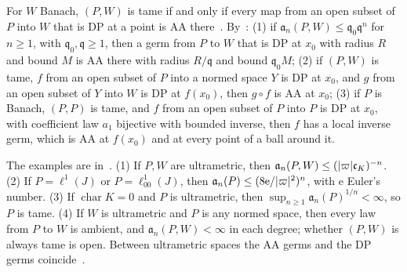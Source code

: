 For $W$ Banach, $(P,W)$ is tame if and only if every map from an open subset of $P$ into $W$ that is DP at a point is AA there~\cite[Proposition~14.37]{I}. By~\cite[Theorem~14.38]{I}: (1) if $\mathfrak a_n(P,W)\le\mathfrak q_0\mathfrak q^n$ for $n\ge1$, with $\mathfrak q_0,\mathfrak q\ge1$, then a germ from $P$ to $W$ that is DP at $x_0$ with radius $R$ and bound $M$ is AA there with radius $R/\mathfrak q$ and bound $\mathfrak q_0M$; (2) if $(P,W)$ is tame, $f$ from an open subset of $P$ into a normed space $Y$ is DP at $x_0$, and $g$ from an open subset of $Y$ into $W$ is DP at $f(x_0)$, then $g\circ f$ is AA at $x_0$; (3) if $P$ is Banach, $(P,P)$ is tame, and $f$ from an open subset of $P$ into $P$ is DP at $x_0$, with coefficient law $a_1$ bijective with bounded inverse, then $f$ has a local inverse germ, which is AA at $f(x_0)$ and at every point of a ball around it.

The examples are in~\cite[Theorem~14.39]{I}. (1) If $P,W$ are ultrametric, then $\mathfrak a_n(P,W)\le(\lvert \varpi\rvert\mathfrak c_K)^{-n}$. (2) If $P=\ell^1(J)$ or $P=\ell^1_{00}(J)$, then $\mathfrak a_n(P)\le(8\mathrm e/\lvert \varpi\rvert^2)^n$, with $\mathrm e$ Euler's number. (3) If $\operatorname{char}K=0$ and $P$ is ultrametric, then $\sup_{n\ge1}\mathfrak a_n(P)^{1/n}<\infty$, so $P$ is tame. (4) If $W$ is ultrametric and $P$ is any normed space, then every law from $P$ to $W$ is ambient, and $\mathfrak a_n(P,W)<\infty$ in each degree; whether $(P,W)$ is always tame is open. Between ultrametric spaces the AA germs and the DP germs coincide~\cite[Theorem~14.39(1)]{I}.

